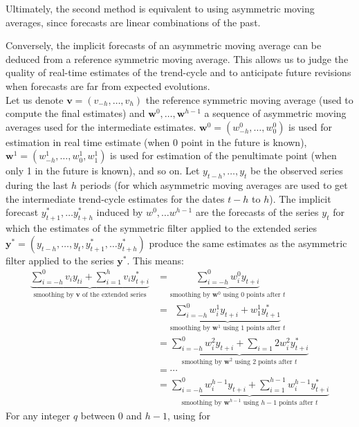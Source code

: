 \documentclass[
]{article}
\newcommand\1{\mathds{1}}
\begin{document}
Ultimately, the second method is equivalent to using asymmetric moving
averages, since forecasts are linear combinations of the past.

Conversely, the implicit forecasts of an asymmetric moving average can
be deduced from a reference symmetric moving average. This allows us to
judge the quality of real-time estimates of the trend-cycle and to
anticipate future revisions when forecasts are far from expected
evolutions.\\
Let us denote \(\boldsymbol v=(v_{-h},\dots, v_{h})\) the reference
symmetric moving average (used to compute the final estimates) and
\(\boldsymbol w^0,\dots, \boldsymbol w^{h-1}\) a sequence of asymmetric
moving averages used for the intermediate estimates.
\(\boldsymbol w^0=(w_{-h}^0, \dots, w_{0}^0)\) is used for estimation in
real time estimate (when 0 point in the future is known),
\(\boldsymbol w^1=(w_{-h}^1, \dots, w_{0}^1, w_{1}^1)\) is used for
estimation of the penultimate point (when only 1 in the future is
known), and so on. Let \(y_{t-h},\dots,y_{t}\) be the observed series
during the last \(h\) periods (for which asymmetric moving averages are
used to get the intermediate trend-cycle estimates for the dates \(t-h\)
to \(h\)). The implicit forecast \(y_{t+1}^*,\dots y_{t+h}^*\) induced
by \(w^0,\dots w^{h-1}\) are the forecasts of the series \(y_t\) for
which the estimates of the symmetric filter applied to the extended
series
\(\boldsymbol y^* = (y_{t-h}, \dots, y_t, y_{t+1}^*,\dots y_{t+h}^*)\)
produce the same estimates as the asymmetric filter applied to the
series \(\boldsymbol y^*\). This means: \begin{align*}
\underbrace{\sum_{i=-h}^0 v_iy_{ti} + \sum_{i=1}^h v_iy_{t+i}^*}_{\text{smoothing by }\boldsymbol v\text{ of the extended series}} &=
\underbrace{\sum_{i=-h}^0 w_i^0y_{t+i}}_{\text{smoothing by }\boldsymbol w^0\text{ using }0\text{ points after }t} \\
&=
\underbrace{\sum_{i=-h}^0 w_i^1y_{t+i} + w_1^1y_{t+1}^*}_{\text{smoothing by }\boldsymbol w^1\text{ using }1\text{ points after }t} \\
&= \underbrace{\sum_{i=-h}^0 w_i^2y_{t+i} + \sum_{i=1}{2}w_i^2y_{t+i}^*}_{\text{smoothing by }\boldsymbol w^2\text{ using }2\text{ points after }t} \\
&= \cdots \\
&=\underbrace{\sum_{i=-h}^0 w_i^{h-1}y_{t+i} + \sum_{i=1}^{h-1} w_i^{h-1}y_{t+i}^*}_{\text{smoothing by }\boldsymbol w^{h-1}\text{ using }h-1\text{ points after }t}
\end{align*} For any integer \(q\) between 0 and \(h-1\), using for
\end{document}
